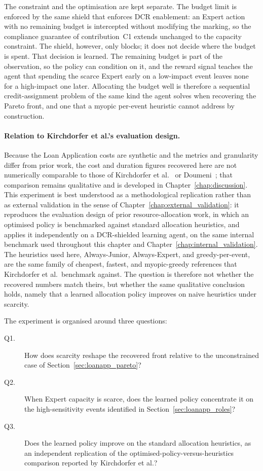 The constraint and the optimisation are kept separate. The budget limit
is enforced by the same shield that enforces \ac{DCR} enablement: an
Expert action with no remaining budget is intercepted without modifying
the marking, so the compliance guarantee of contribution~C1 extends
unchanged to the capacity constraint. The shield, however, only blocks;
it does not decide where the budget is spent. That decision is learned.
The remaining budget is part of the observation, so the policy can
condition on it, and the reward signal teaches the agent that spending
the scarce Expert early on a low-impact event leaves none for a
high-impact one later. Allocating the budget well is therefore a
sequential credit-assignment problem of the same kind the agent solves
when recovering the Pareto front, and one that a myopic per-event
heuristic cannot address by construction.

\paragraph{Relation to Kirchdorfer et al.'s evaluation design.}
Because the Loan Application costs are synthetic and the metrics and
granularity differ from prior work, the cost and duration figures
recovered here are not numerically comparable to those of Kirchdorfer et
al.~\cite{KirchdorferLukasFromPolicies} or
Doumeni~\cite{ArtemisDoumeniParetoAgentSimulator}; that comparison
remains qualitative and is developed in Chapter~\ref{chap:discussion}.
This experiment is best understood as a methodological replication
rather than as external validation in the sense of
Chapter~\ref{chap:external_validation}: it reproduces the evaluation
design of prior resource-allocation work, in which an optimised policy
is benchmarked against standard allocation heuristics, and applies it
independently on a \ac{DCR}-shielded learning agent, on the same
internal benchmark used throughout this chapter and
Chapter~\ref{chap:internal_validation}. The heuristics used here,
Always-Junior, Always-Expert, and greedy-per-event, are the same family
of cheapest, fastest, and myopic-greedy references that Kirchdorfer et
al.\ benchmark against. The question is therefore not whether the
recovered numbers match theirs, but whether the same qualitative
conclusion holds, namely that a learned allocation policy improves on
naive heuristics under scarcity.

The experiment is organised around three questions:
\begin{description}
  \item[Q1.] How does scarcity reshape the recovered front relative to
  the unconstrained case of Section~\ref{sec:loanapp_pareto}?
  \item[Q2.] When Expert capacity is scarce, does the learned policy
  concentrate it on the high-sensitivity events identified in
  Section~\ref{sec:loanapp_roles}?
  \item[Q3.] Does the learned policy improve on the standard allocation
  heuristics, as an independent replication of the
  optimised-policy-versus-heuristics comparison reported by Kirchdorfer
  et al.?
\end{description}

